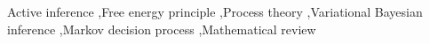 \documentclass[review,12pt,authoryear]{elsarticle}
\begin{document}
\begin{frontmatter}

\begin{keyword}
Active inference \sep Free energy principle \sep Process theory \sep Variational Bayesian inference \sep Markov decision process \sep Mathematical review


\end{keyword}


\end{frontmatter}
\tableofcontents

\linenumbers
\end{document}
